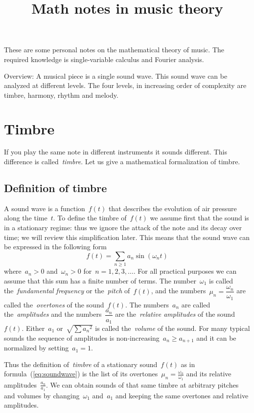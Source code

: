 \title{Math notes in music theory}

These are some personal notes on the mathematical theory of music.
The required knowledge is single-variable calculus and Fourier analysis.

Overview: A musical piece is a single sound wave.  This sound wave can be
analyzed at different levels.  The four levels, in increasing order of
complexity are timbre, harmony, rhythm and melody.

\section{Timbre}

If you play the same note in different instruments it sounds
different.  This difference is called~\emph{timbre}.
Let us give a mathematical formalization of timbre.

\subsection{Definition of timbre}
A sound wave is a function~$f(t)$ that describes the evolution of air
pressure along the time~$t$.  To define the timbre of~$f(t)$ we assume first
that the sound is in a stationary regime: thus we ignore the attack of the note
and its decay over time; we will review this simplification later.  This means
that the sound wave can be expressed in the following form
\begin{equation}\label{eq:soundwave}
	f(t) = \sum_{n\ge 1} a_n\sin\left(\omega_n t\right)
\end{equation}
where~$a_n>0$ and~$\omega_n>0$ for~$n=1,2,3,\ldots$.  For all practical
purposes we can assume that this sum has a finite number of terms.  The
number~$\omega_1$ is called the~\emph{fundamental frequency} or
the~\emph{pitch} of~$f(t)$, and the numbers~$\mu_n=\dfrac{\omega_n}{\omega_1}$
are called the~\emph{overtones} of the sound~$f(t)$.  The numbers~$a_n$ are
called the~\emph{amplitudes} and the numbers~$\dfrac{a_n}{a_1}$ are
the~\emph{relative amplitudes} of the sound~$f(t)$.  Either~$a_1$
or~$\sqrt{\sum {a_n}^2}$ is called the~\emph{volume} of the
sound.  For many typical sounds the sequence of amplitudes is
non-increasing~$a_n\ge a_{n+1}$ and it can be normalized by setting~$a_1=1$.

Thus the definition of~\emph{timbre} of a stationary sound~$f(t)$ as in
formula~(\ref{eq:soundwave}) is the list of its
overtones~$\mu_n=\frac{\omega_n}{\omega_1}$ and its relative
amplitudes~$\frac{a_n}{a_1}$.  We can obtain sounds of that same timbre at
arbitrary pitches and volumes by changing~$\omega_1$ and~$a_1$ and keeping
the same overtones and relative amplitudes.


